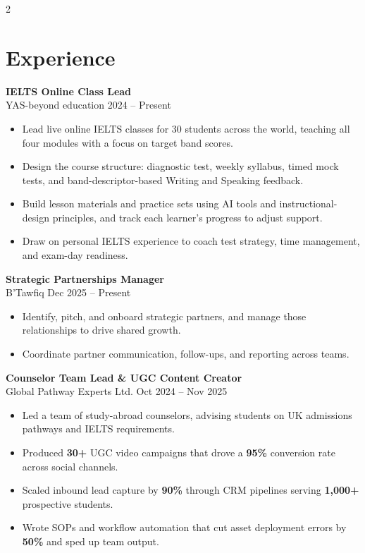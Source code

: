 \documentclass[a4paper,10pt]{article}
\begin{document}
\begin{multicols}{2}
\columnbreak

\section*{Experience}

\textbf{IELTS Online Class Lead} \\
YAS-beyond education \hfill 2024 -- Present
\begin{itemize}[leftmargin=1em]
  \item Lead live online IELTS classes for 30 students across the world, teaching all four modules with a focus on target band scores.
  \item Design the course structure: diagnostic test, weekly syllabus, timed mock tests, and band-descriptor-based Writing and Speaking feedback.
  \item Build lesson materials and practice sets using AI tools and instructional-design principles, and track each learner's progress to adjust support.
  \item Draw on personal IELTS experience to coach test strategy, time management, and exam-day readiness. \\
\end{itemize}

\textbf{Strategic Partnerships Manager} \\
B'Tawfiq \hfill Dec 2025 -- Present
\begin{itemize}[leftmargin=1em]
  \item Identify, pitch, and onboard strategic partners, and manage those relationships to drive shared growth.
  \item Coordinate partner communication, follow-ups, and reporting across teams. \\
\end{itemize}

\textbf{Counselor Team Lead \& UGC Content Creator} \\
Global Pathway Experts Ltd. \hfill Oct 2024 -- Nov 2025
\begin{itemize}[leftmargin=1em]
  \item Led a team of study-abroad counselors, advising students on UK admissions pathways and IELTS requirements.
  \item Produced \textbf{30+} UGC video campaigns that drove a \textbf{95\%} conversion rate across social channels.
  \item Scaled inbound lead capture by \textbf{90\%} through CRM pipelines serving \textbf{1,000+} prospective students.
  \item Wrote SOPs and workflow automation that cut asset deployment errors by \textbf{50\%} and sped up team output. \\
\end{itemize}


\end{multicols}
\end{document}
